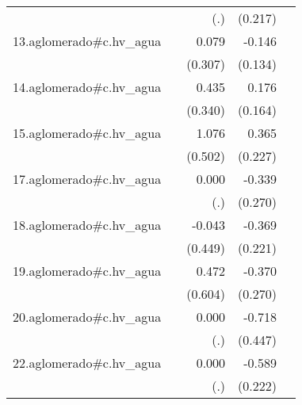 {\begin{longtable}{l*{4}{D{.}{.}{-1}}}
            &                     &         (.)         &     (0.217)         &                     \\
\addlinespace
13.aglomerado#c.hv\_agua&                     &       0.079         &      -0.146         &                     \\
            &                     &     (0.307)         &     (0.134)         &                     \\
\addlinespace
14.aglomerado#c.hv\_agua&                     &       0.435         &       0.176         &                     \\
            &                     &     (0.340)         &     (0.164)         &                     \\
\addlinespace
15.aglomerado#c.hv\_agua&                     &       1.076\sym{*}  &       0.365         &                     \\
            &                     &     (0.502)         &     (0.227)         &                     \\
\addlinespace
17.aglomerado#c.hv\_agua&                     &       0.000         &      -0.339         &                     \\
            &                     &         (.)         &     (0.270)         &                     \\
\addlinespace
18.aglomerado#c.hv\_agua&                     &      -0.043         &      -0.369         &                     \\
            &                     &     (0.449)         &     (0.221)         &                     \\
\addlinespace
19.aglomerado#c.hv\_agua&                     &       0.472         &      -0.370         &                     \\
            &                     &     (0.604)         &     (0.270)         &                     \\
\addlinespace
20.aglomerado#c.hv\_agua&                     &       0.000         &      -0.718         &                     \\
            &                     &         (.)         &     (0.447)         &                     \\
\addlinespace
22.aglomerado#c.hv\_agua&                     &       0.000         &      -0.589\sym{**} &                     \\
            &                     &         (.)         &     (0.222)         &                     \\

\end{longtable}}
